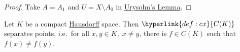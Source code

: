 \documentclass{article}
\newcommand{\K}{\mathbb{K}}
\begin{document}
\begin{proof}
    Take $A = A_1$ and $U = X \setminus A_0$ in \hyperlink{prop:urysohn}{Urysohn's Lemma}.
\end{proof}

\begin{cor}
    Let $K$ be a compact \hyperlink{def:hausdorff}{Hausdorff} space.
    Then $\hyperlink{def:cx}{C(K)}$ separates points, i.e.\ for all $x, y \in K, \; x \neq y$, there is $f \in C(K)$ such that $f(x) \neq f(y)$.
\end{cor}

\end{document}
